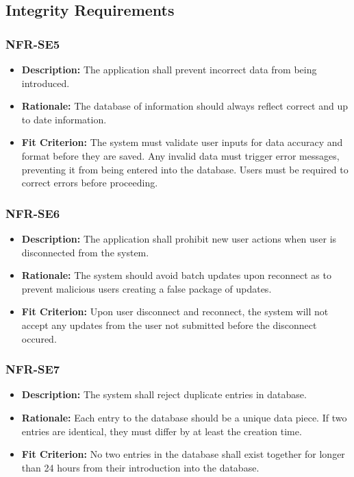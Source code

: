 \documentclass[12pt]{article}
\begin{document}
\subsection{Integrity Requirements}
\subsubsection*{NFR-SE5}
\begin{itemize}
  \item \textbf{Description:} The application shall prevent incorrect data from being introduced.
  \item \textbf{Rationale:} The database of information should always reflect correct and up to date information.
  \item \textbf{Fit Criterion:} The system must validate user inputs for data accuracy and format before they are saved. Any invalid data must trigger error messages, preventing it from being entered into the database. Users must be required to correct errors before proceeding.
\end{itemize}
\subsubsection*{NFR-SE6}
\begin{itemize}
  \item \textbf{Description:} The application shall prohibit new user actions when user is disconnected from the system.
  \item \textbf{Rationale:} The system should avoid batch updates upon reconnect as to prevent malicious users creating a false package of updates.
  \item \textbf{Fit Criterion:} Upon user disconnect and reconnect, the system will not accept any updates from the user not submitted before the disconnect occured.
\end{itemize}
\subsubsection*{NFR-SE7}
\begin{itemize}
  \item \textbf{Description:} The system shall reject duplicate entries in database.
  \item \textbf{Rationale:} Each entry to the database should be a unique data piece. If two entries are identical, they must differ by at least the creation time.
  \item \textbf{Fit Criterion:} No two entries in the database shall exist together for longer than 24 hours from their introduction into the database.
\end{itemize}
\end{document}
